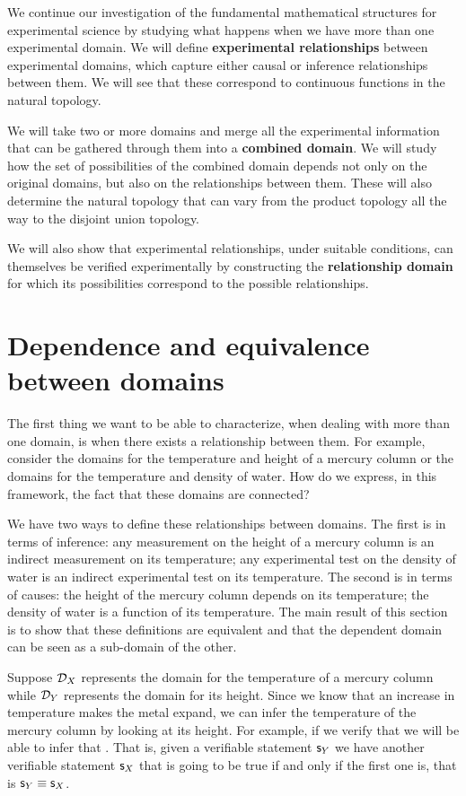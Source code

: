 \documentclass[11pt,letterpaper,fleqn]{memoir} %
\begin{document}
We continue our investigation of the fundamental mathematical structures for experimental science by studying what happens when we have more than one experimental domain. We will define \textbf{experimental relationships} between experimental domains, which capture either causal or inference relationships between them. We will see that these correspond to continuous functions in the natural topology.

We will take two or more domains and merge all the experimental information that can be gathered through them into a \textbf{combined domain}. We will study how the set of possibilities of the combined domain depends not only on the original domains, but also on the relationships between them. These will also determine the natural topology that can vary from the product topology all the way to the disjoint union topology.

We will also show that experimental relationships, under suitable conditions, can themselves be verified experimentally by constructing the \textbf{relationship domain} for which its possibilities correspond to the possible relationships.

\section{Dependence and equivalence between domains}

The first thing we want to be able to characterize, when dealing with more than one domain, is when there exists a relationship between them. For example, consider the domains for the temperature and height of a mercury column or the domains for the temperature and density of water. How do we express, in this framework, the fact that these domains are connected?

We have two ways to define these relationships between domains. The first is in terms of inference: any measurement on the height of a mercury column is an indirect measurement on its temperature; any experimental test on the density of water is an indirect experimental test on its temperature. The second is in terms of causes: the height of the mercury column depends on its temperature; the density of water is a function of its temperature. The main result of this section is to show that these definitions are equivalent and that the dependent domain can be seen as a sub-domain of the other.

Suppose $\mathcal{D}_X$ represents the domain for the temperature of a mercury column while $\mathcal{D}_Y$ represents the domain for its height. Since we know that an increase in temperature makes the metal expand, we can infer the temperature of the mercury column by looking at its height. For example, if we verify that  we will be able to infer that . That is, given a verifiable statement $\mathsf{s}_Y$ we have another verifiable statement $\mathsf{s}_X$ that is going to be true if and only if the first one is, that is $\mathsf{s}_Y\equiv\mathsf{s}_X$.
\end{document}
